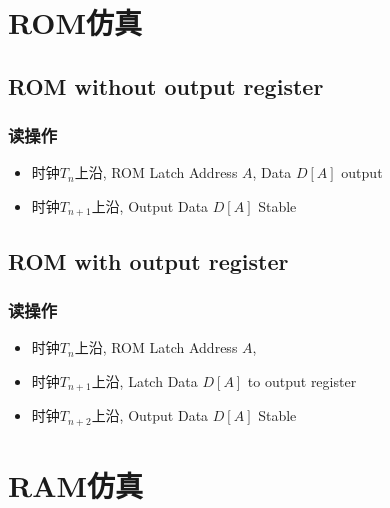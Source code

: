 \documentclass[10pt]{book}
\begin{document}
\section{ROM仿真}
\subsection{ROM without output register}
\subsubsection{读操作}
\begin{itemize}
  \item 时钟$T_{n}$上沿, ROM Latch Address $A$, Data $D[A]$ output
  \item 时钟$T_{n+1}$上沿, Output Data $D[A]$ Stable
\end{itemize}

\subsection{ROM with output register}
\subsubsection{读操作}
\begin{itemize}
  \item 时钟$T_{n}$上沿, ROM Latch Address $A$, 
  \item 时钟$T_{n+1}$上沿, Latch Data $D[A]$ to output register
  \item 时钟$T_{n+2}$上沿, Output Data $D[A]$ Stable
\end{itemize}

\section{RAM仿真}
\end{document}
